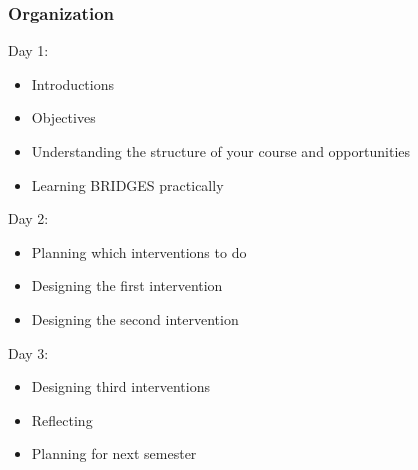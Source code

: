 \documentclass[aspectratio=169]{beamer}
\begin{document}
\begin{frame}
  \frametitle{Organization}

  Day 1:
  \begin{itemize}
  \item Introductions
  \item Objectives
  \item Understanding the structure of your course and opportunities
  \item Learning BRIDGES practically
  \end{itemize}
  
  Day 2:
  \begin{itemize}
  \item Planning which interventions to do
  \item Designing the first intervention
  \item Designing the second intervention
  \end{itemize}

  
  Day 3:
  \begin{itemize}
  \item Designing third  interventions
  \item Reflecting
  \item Planning for next semester
  \end{itemize}
  
\end{frame}
\end{document}
